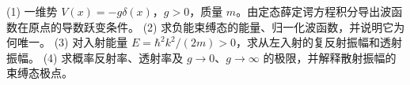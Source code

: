 (1) 一维势 \(V(x)=-g\delta(x)\)，\(g>0\)，质量 \(m\)。由定态薛定谔方程积分导出波函数在原点的导数跃变条件。
(2) 求负能束缚态的能量、归一化波函数，并说明它为何唯一。
(3) 对入射能量 \(E=\hbar^2k^2/(2m)>0\)，求从左入射的复反射振幅和透射振幅。
(4) 求概率反射率、透射率及 \(g\to0\)、\(g\to\infty\) 的极限，并解释散射振幅的束缚态极点。
